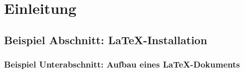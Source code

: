 \chapter{Einleitung}

\nocite{*}


\section{Beispiel Abschnitt: \LaTeX-Installation}



\subsection{Beispiel Unterabschnitt: Aufbau eines \LaTeX-Dokuments}

